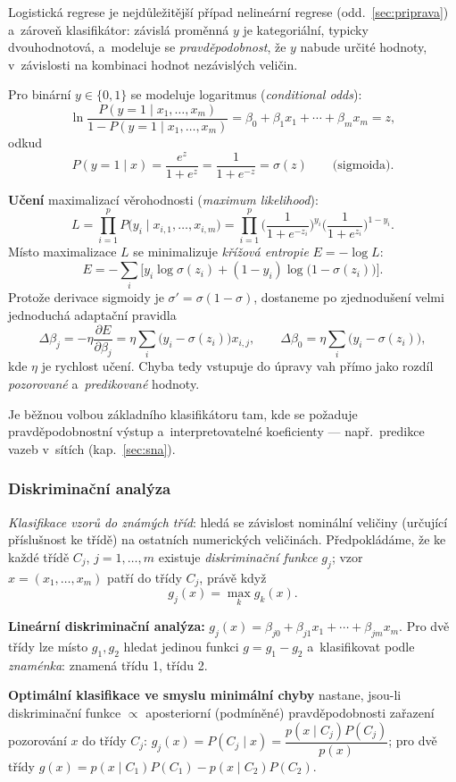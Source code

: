 \documentclass[11pt,a4paper]{article}
\theoremstyle{definition}
\begin{document}
Logistická regrese je nejdůležitější případ nelineární regrese (odd.~\ref{sec:priprava}) a~zároveň
klasifikátor: závislá proměnná $y$ je kategoriální, typicky dvouhodnotová, a~modeluje se
\emph{pravděpodobnost}, že $y$ nabude určité hodnoty, v~závislosti na kombinaci hodnot
nezávislých veličin.

\begin{defbox}
Pro binární $y\in\{0,1\}$ se modeluje logaritmus 
(\emph{conditional odds}):
\[ \ln\frac{P(y=1\mid x_1,\dots,x_m)}{1-P(y=1\mid x_1,\dots,x_m)}
   =\beta_0+\beta_1x_1+\cdots+\beta_mx_m=z, \]
odkud
\[ P(y=1\mid x)=\frac{e^{z}}{1+e^{z}}=\frac{1}{1+e^{-z}}=\sigma(z)
   \qquad\text{(sigmoida).} \]

\textbf{Učení} maximalizací věrohodnosti (\emph{maximum likelihood}):
\[ L=\prod_{i=1}^{p}P\big(y_i\mid x_{i,1},\dots,x_{i,m}\big)
   =\prod_{i=1}^{p}\Big(\frac{1}{1+e^{-z_i}}\Big)^{y_i}
     \Big(\frac{1}{1+e^{z_i}}\Big)^{1-y_i}. \]
Místo maximalizace $L$ se minimalizuje \emph{křížová entropie} $E=-\log L$:
\[ E=-\sum_i\Big[y_i\log\sigma(z_i)+(1-y_i)\log\big(1-\sigma(z_i)\big)\Big]. \]
Protože derivace sigmoidy je $\sigma'=\sigma(1-\sigma)$, dostaneme po zjednodušení velmi
jednoduchá adaptační pravidla
\[ \Delta\beta_j=-\eta\frac{\partial E}{\partial\beta_j}
   =\eta\sum_i\big(y_i-\sigma(z_i)\big)x_{i,j},\qquad
   \Delta\beta_0=\eta\sum_i\big(y_i-\sigma(z_i)\big), \]
kde $\eta$ je rychlost učení. Chyba tedy vstupuje do úpravy vah přímo jako rozdíl
\emph{pozorované} a~\emph{predikované} hodnoty.
\end{defbox}

Je běžnou volbou základního klasifikátoru tam, kde se požaduje pravděpodobnostní výstup
a~interpretovatelné koeficienty --- např.\ predikce vazeb v~sítích (kap.~\ref{sec:sna}).

\subsubsection{Diskriminační analýza}
\label{ssec:da}

\begin{defbox}
\emph{Klasifikace vzorů do známých tříd}: hledá se závislost nominální veličiny (určující
příslušnost ke třídě) na ostatních numerických veličinách. Předpokládáme, že ke každé třídě
$C_j$, $j=1,\dots,m$ existuje \emph{diskriminační funkce} $g_j$; vzor
$x=(x_1,\dots,x_m)$ patří do třídy $C_j$, právě když
\[ g_j(x)=\max_{k} g_k(x). \]

\textbf{Lineární diskriminační analýza:} $g_j(x)=\beta_{j0}+\beta_{j1}x_1+\cdots+\beta_{jm}x_m$.
Pro dvě třídy lze místo $g_1,g_2$ hledat jedinou funkci $g=g_1-g_2$ a~klasifikovat podle
\emph{znaménka}: \uv{$+$} znamená třídu 1, \uv{$-$} třídu 2.

\textbf{Optimální klasifikace ve smyslu minimální chyby} nastane, jsou-li diskriminační
funkce $\propto$ aposteriorní (podmíněné) pravděpodobnosti zařazení pozorování $x$ do
třídy $C_j$: $g_j(x)=P(C_j\mid x)=\dfrac{p(x\mid C_j)P(C_j)}{p(x)}$; pro dvě třídy
$g(x)=p(x\mid C_1)P(C_1)-p(x\mid C_2)P(C_2)$.
\end{defbox}
\end{document}

